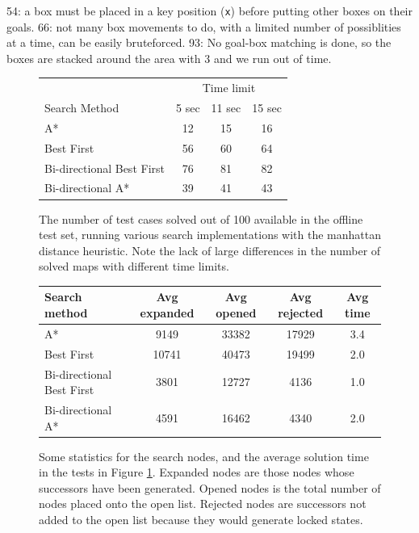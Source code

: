 \documentclass[a4paper,11pt]{article}
\begin{document}
54: a box must be placed in a key position (\texttt{x}) before putting other boxes on their goals. 66: not many box movements to do, with a limited number of possiblities at a time, can be easily bruteforced. 93: No goal-box matching is done, so the boxes are stacked around the area with 3  and we run out of time.

\begin{figure}
  \centering
  \begin{tabular}{lccc}
    & \multicolumn{3}{c}{Time limit}\\
    \cline{2-4}
    Search Method              &  5 sec  &  11 sec  &  15 sec  \\
    \hline
    A*                         &     12  &      15  &      16  \\
    Best First                 &     56  &      60  &      64  \\
    Bi-directional Best First  &     76  &      81  &      82  \\
    Bi-directional A*          &     39  &      41  &      43  \\
  \end{tabular}

  \caption{The number of test cases solved out of 100 available in the offline
    test set, running various search implementations with the manhattan distance
    heuristic. Note the lack of large differences in the number of solved maps
    with different time limits.}
  \label{fig:passedtests}
\end{figure}

\begin{figure}
  \centering
  \begin{center}
    \begin{tabular}{lcccc}
      Search method              &  Avg expanded  &  Avg opened  &  Avg rejected  &  Avg time  \\
      \hline
      A*                         &          9149  &       33382  &         17929  &           3.4  \\
      Best First                 &         10741  &       40473  &         19499  &           2.0  \\
      Bi-directional Best First  &          3801  &       12727  &          4136  &           1.0  \\
      Bi-directional A*          &          4591  &       16462  &          4340  &           2.0  \\
    \end{tabular}
  \end{center}

  \caption{Some statistics for the search nodes, and the average solution time
    in the tests in Figure \ref{fig:passedtests}. Expanded nodes are those nodes
    whose successors have been generated. Opened nodes is the total number of
    nodes placed onto the open list. Rejected nodes are successors not added to
    the open list because they would generate locked states.}
  \label{fig:timings}
\end{figure}
\end{document}
